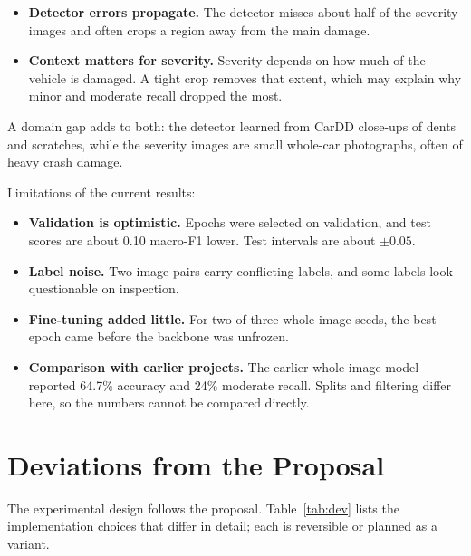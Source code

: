 \documentclass[11pt]{article}
\begin{document}
\begin{itemize}
  \item \textbf{Detector errors propagate.} The detector misses about half of the severity images and often crops a region away from the main damage.
  \item \textbf{Context matters for severity.} Severity depends on how much of the vehicle is damaged. A tight crop removes that extent, which may explain why minor and moderate recall dropped the most.
\end{itemize}

A domain gap adds to both: the detector learned from CarDD close-ups of dents and scratches, while the severity images are small whole-car photographs, often of heavy crash damage.

Limitations of the current results:
\begin{itemize}
  \item \textbf{Validation is optimistic.} Epochs were selected on validation, and test scores are about 0.10 macro-F1 lower. Test intervals are about $\pm 0.05$.
  \item \textbf{Label noise.} Two image pairs carry conflicting labels, and some labels look questionable on inspection.
  \item \textbf{Fine-tuning added little.} For two of three whole-image seeds, the best epoch came before the backbone was unfrozen.
  \item \textbf{Comparison with earlier projects.} The earlier whole-image model reported 64.7\% accuracy and 24\% moderate recall. Splits and filtering differ here, so the numbers cannot be compared directly.
\end{itemize}

\section{Deviations from the Proposal}

The experimental design follows the proposal. Table~\ref{tab:dev} lists the implementation choices that differ in detail; each is reversible or planned as a variant.
\end{document}
